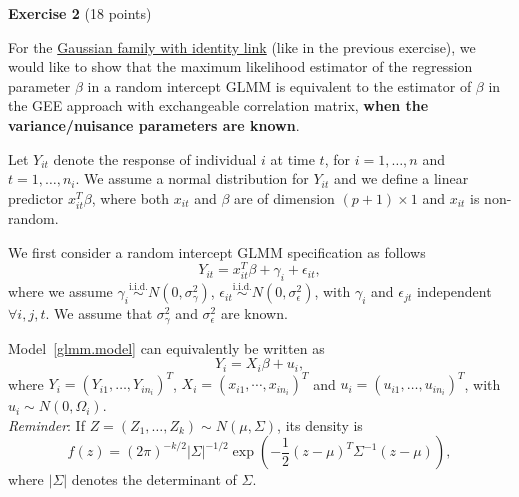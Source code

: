 \documentclass[11pt,a4paper%
addpoints, 
answers%
]{exam}
\begin{document}
\newpage
{\Large \textbf{Exercise 2} \hfill (18 points)}

For the \underline{Gaussian family with identity link} (like in the previous exercise), we would like to show that the maximum likelihood estimator of the regression parameter $\beta$ in a random intercept GLMM is equivalent to the estimator of $\beta$ in the GEE approach with exchangeable correlation matrix, \textbf{when the variance/nuisance parameters are known}.

Let $Y_{it}$ denote the response of individual $i$ at time $t$, for $i=1,\ldots,n$ and $t=1,\ldots,n_i$. We assume a normal distribution for
$Y_{it}$ and we define a linear predictor $x_{it}^T\beta$, where both $x_{it}$ and $\beta$ are of dimension $(p+1) \times 1$ and $x_{it}$ is non-random.

\bigskip

We first consider a random intercept GLMM specification as follows
\begin{equation}\label{glmm.model}
    Y_{it}=x_{it}^T\beta+\gamma_i+\epsilon_{it},
\end{equation}
where we assume $\gamma_i\overset{\text{i.i.d.}}{\sim}N(0,\sigma^2_\gamma)$, $\epsilon_{it}\overset{\text{i.i.d.}}{\sim} N(0,\sigma^2_\epsilon)$, with $\gamma_i$  and $\epsilon_{jt}$ independent $\forall i, j, t$. We assume that $\sigma^2_\gamma$ and $\sigma^2_\epsilon$ are known.

Model~\eqref{glmm.model} can equivalently be written as
\begin{equation}\label{glmm.model.vector}
    Y_i=X_i\beta+u_i,
\end{equation}
where $Y_i = (Y_{i1},\ldots,Y_{in_i})^T$, $X_i = (x_{i1}, \cdots, x_{in_i})^T$ and $u_i=(u_{i1},\ldots,u_{in_i})^T$, with $u_i \sim N(0,\Omega_i)$.\\


\textit{Reminder}: If $Z = (Z_1,\ldots,Z_k)\sim N(\mu,\Sigma)$, its density is $$f(z) = (2\pi)^{-k/2} |\Sigma|^{-1/2}
\exp\left(-\frac{1}{2}\left(z-\mu \right)^T\Sigma^{-1}\left(z-\mu\right) \right),$$
where $|\Sigma|$ denotes the determinant of $\Sigma$.
\end{document}
